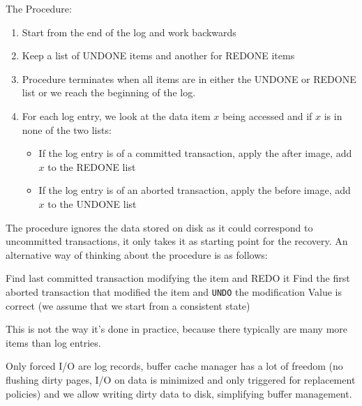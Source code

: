 The Procedure:
\begin{enumerate}
    \item Start from the end of the log and work backwards
    \item Keep a list of UNDONE items and another for REDONE items
    \item Procedure terminates when all items are in either the UNDONE or REDONE list or we reach the beginning of the log.
    \item For each log entry, we look at the data item $x$ being accessed and if $x$ is in none of the two lists:
          \begin{itemize}
              \item If the log entry is of a committed transaction, apply the after image, add $x$ to the REDONE list
              \item If the log entry is of an aborted transaction, apply the before image, add $x$ to the UNDONE list
          \end{itemize}
\end{enumerate}
The procedure ignores the data stored on disk as it could correspond to uncommitted transactions, it only takes it as starting point for the recovery.
An alternative way of thinking about the procedure is as follows:
\begin{algorithm}
    \caption{Undo-Redo Recovery}
    \begin{algorithmic}[1]
                \State Find last committed transaction modifying the item and REDO it
                    \State Find the first aborted transaction that modified the item and \texttt{UNDO} the modification
                \EndIf
                    \State Value is correct (we assume that we start from a consistent state)
                \EndIf
            \EndFor
        \EndProcedure
    \end{algorithmic}
\end{algorithm}
This is not the way it's done in practice, because there typically are many more items than log entries.

 Only forced I/O are log records, buffer cache manager has a lot of freedom
(no flushing dirty pages, I/O on data is minimized and only triggered for replacement policies) and we allow writing dirty data to disk, simplifying buffer management.

